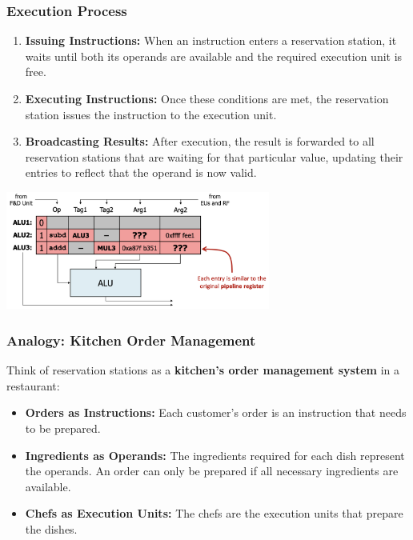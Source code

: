 \subsubsection{Execution Process}

\begin{enumerate}
    \item \textbf{Issuing Instructions:} When an instruction enters a reservation station, it waits until both its operands are available and the required execution unit is free.
    \item \textbf{Executing Instructions:} Once these conditions are met, the reservation station issues the instruction to the execution unit.
    \item \textbf{Broadcasting Results:} After execution, the result is forwarded to all reservation stations that are waiting for that particular value, updating their entries to reflect that the operand is now valid.
\end{enumerate}

\begin{center}
    \includegraphics[width=0.65\textwidth]{chapters/chapter4d/images/reservation_table.png}
\end{center}

\subsubsection{Analogy: Kitchen Order Management}

Think of reservation stations as a \textbf{kitchen's order management system} in a restaurant:

\begin{itemize}
    \item \textbf{Orders as Instructions:} Each customer's order is an instruction that needs to be prepared.
    \item \textbf{Ingredients as Operands:} The ingredients required for each dish represent the operands. An order can only be prepared if all necessary ingredients are available.
    \item \textbf{Chefs as Execution Units:} The chefs are the execution units that prepare the dishes.
\end{itemize}

